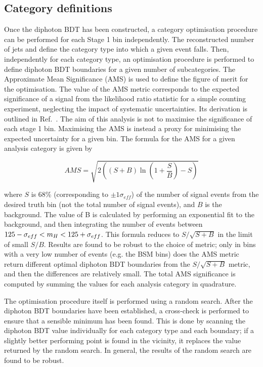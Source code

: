 \subsection{Category definitions}

Once the diphoton BDT has been constructed, 
a category optimisation procedure can be performed for each Stage 1 bin independently.
The reconstructed number of jets and \ptgg define the category type into which a given event falls.
Then, independently for each category type, 
an optimisation procedure is performed to define diphoton BDT boundaries 
for a given number of subcategories.
The Approximate Mean Significance (AMS) is used to define the figure of merit for the optimisation.
The value of the AMS metric corresponds to the expected significance of a signal 
from the likelihood ratio statistic for a simple counting experiment, 
neglecting the impact of systematic uncertainties.
Its derivation is outlined in Ref.~\cite{Asymptotic}.
The aim of this analysis is not to maximise the significance of each stage 1 bin.
Maximising the AMS is instead a proxy for minimising the expected uncertainty for a given bin.
The formula for the AMS for a given analysis category is given by 

\begin{equation*}
  AMS = \sqrt{ 2 \left( (S+B) \ln{\left(1+\frac{S}{B}\right)} - S \right) }
\end{equation*}

where $S$ is 68\% (corresponding to $\pm 1\sigma_{eff}$) of the number of signal events 
from the desired truth bin (not the total number of signal events), and $B$ is the background.
The value of B is calculated by performing an exponential fit to the background, 
and then integrating the number of events between $125 - \sigma_{eff} < m_{H} < 125 + \sigma_{eff}$.
This formula reduces to $S/\sqrt{S+B}$ in the limit of small $S/B$.
Results are found to be robust to the choice of metric; 
only in bins with a very low number of events (e.g. the BSM bins) 
does the AMS metric return different optimal diphoton BDT boundaries from the $S/\sqrt{S+B}$ metric, 
and then the differences are relatively small.
The total AMS significance is computed by summing the values for each analysis category in quadrature.

The optimisation procedure itself is performed using a random search. 
After the diphoton BDT boundaries have been established, 
a cross-check is performed to ensure that a sensible minimum has been found.
This is done by scanning the diphoton BDT value individually for each category type and each boundary; 
if a slightly better performing point is found in the vicinity, 
it replaces the value returned by the random search.
In general, the results of the random search are found to be robust.

